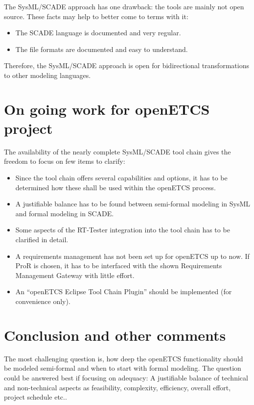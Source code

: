 The SysML/SCADE approach has one drawback: the tools are mainly not open source. 
These facts may help to better come to terms with it:

\begin{itemize}
	\item The SCADE language is documented and very regular. 
	\item The file formats are documented and easy to understand. 
\end{itemize}

Therefore, the SysML/SCADE approach is open for bidirectional transformations to other modeling languages. 


\section{On going work for openETCS project}

The availability of the nearly complete SysML/SCADE tool chain gives the freedom to focus on few items to clarify: 

\begin{itemize}
	\item Since the tool chain offers several capabilities and options, it has to be determined how these shall be used within the openETCS process. 
	\item A justifiable balance has to be found between semi-formal modeling in SysML and formal modeling in SCADE. 
	\item Some aspects of the RT-Tester integration into the tool chain has to be clarified in detail. 
	\item A requirements management has not been set up for openETCS up to now. If ProR is chosen, it has to be interfaced with the shown Requirements Management Gateway with little effort. 
	\item An "`openETCS Eclipse Tool Chain Plugin"' should be implemented (for convenience only).  
\end{itemize}


\section{Conclusion and other comments}

The most challenging question is, how deep the openETCS functionality should be modeled semi-formal and when to start with formal modeling. 
The question could be answered best if focusing on adequacy: A justifiable balance of technical and non-technical aspects as feasibility, complexity, efficiency,  overall effort,  project schedule etc..

